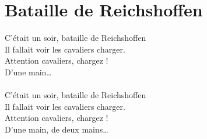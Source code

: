 \section*{Bataille de Reichshoffen}
C’était un soir, bataille de Reichshoffen\\
Il fallait voir les cavaliers charger.\\
Attention cavaliers, chargez !\\
D’une main…\\
\\
C’était un soir, bataille de Reichshoffen\\
Il fallait voir les cavaliers charger.\\
Attention cavaliers, chargez !\\
D’une main, de deux mains…\\